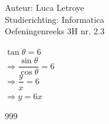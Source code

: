 \documentclass[a4paper]{article}
\begin{document}
  
\noindent \large Auteur: Luca Letroye        \\
\noindent \large Studierichting: Informatica \\
\noindent \large Oefeningenreeks 3H nr. 2.3 \\

\medskip

\normalsize

$\tan \theta = 6$\\

$\Rightarrow \dfrac{\sin \theta}{\cos \theta} = 6$\\

$\Rightarrow \dfrac{y}{x} = 6$\\

$\Rightarrow y = 6x$\\



\begin{thebibliography}{999}
\end{thebibliography}
\end{document}
